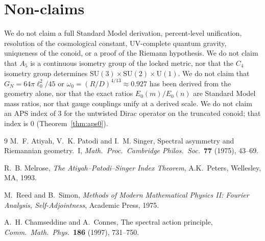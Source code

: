 \documentclass[11pt,a4paper]{article}
\theoremstyle{definition}
\theoremstyle{remark}
\begin{document}
\section{Non-claims}

We do not claim a full Standard Model derivation, percent-level
unification, resolution of the cosmological constant, UV-complete
quantum gravity, uniqueness of the conoid, or a proof of the Riemann
hypothesis. We do not claim that $A_5$ is a continuous isometry group of
the locked metric, nor that the $C_4$ isometry group determines
$\mathrm{SU}(3)\times\mathrm{SU}(2)\times\mathrm{U}(1)$. We do not claim
that $G_N=64\pi\ell_0^2/45$ or
$\omega_0=(R/D)^{4/13}\approx 0.927$ has been derived from the geometry
alone, nor that the exact ratios $E_0(m)/E_0(n)$ are Standard Model mass
ratios, nor that gauge couplings unify at a derived scale. We do not
claim an APS index of $3$ for the untwisted Dirac operator on the
truncated conoid; that index is $0$ (Theorem~\ref{thm:aps0}).

\begin{thebibliography}{9}
M.~F. Atiyah, V.~K. Patodi and I.~M. Singer,
Spectral asymmetry and Riemannian geometry.~I,
\textit{Math.\ Proc.\ Cambridge Philos.\ Soc.}\ \textbf{77} (1975), 43--69.

R.~B. Melrose,
\textit{The Atiyah--Patodi--Singer Index Theorem},
A.K.\ Peters, Wellesley, MA, 1993.

M.~Reed and B.~Simon,
\textit{Methods of Modern Mathematical Physics II: Fourier Analysis, Self-Adjointness},
Academic Press, 1975.

A.~H. Chamseddine and A.~Connes,
The spectral action principle,
\textit{Comm.\ Math.\ Phys.}\ \textbf{186} (1997), 731--750.
\end{thebibliography}
\end{document}
